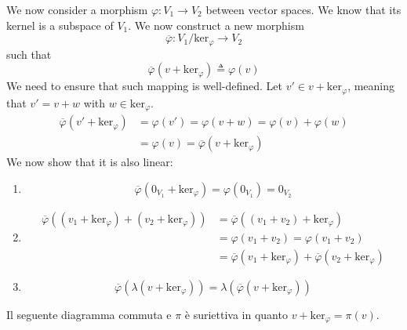 \documentclass[a4paper]{article}
\begin{document}
We now consider a morphism \(\varphi \colon V_1 \to V_2\)
between vector spaces. We know that its kernel is a subspace of \(V_1\).
We now construct a new morphism
\[
    \overline{\varphi} \colon V_1 / \text{ker}_\varphi \to V_2
\]
such that
\[
    \overline{\varphi}(v + \text{ker}_\varphi) \triangleq \varphi(v)
\]
We need to ensure that such mapping is well-defined.
Let \(v' \in v + \text{ker}_\varphi\), meaning that \(v' = v + w\) with \(w \in \text{ker}_\varphi\).
\begin{align*}
    \overline{\varphi}(v' + \text{ker}_\varphi)
    &= \varphi(v') = \varphi(v + w) = \varphi(v) + \varphi(w) \\
    &= \varphi(v) = \overline{\varphi}(v + \text{ker}_\varphi)
\end{align*}
We now show that it is also linear:
\begin{enumerate}
    \item \[
        \overline{\varphi}(0_{V_1} + \text{ker}_\varphi) = \varphi(0_{V_1}) = 0_{V_2}
    \]
    \item \begin{align*}
        \overline{\varphi}((v_1 + \text{ker}_\varphi) + (v_2 + \text{ker}_\varphi))
        &= \overline{\varphi}((v_1 + v_2) + \text{ker}_\varphi) \\
        &= \varphi(v_1 + v_2) = \varphi(v_1 + v_2) \\
        &= \overline{\varphi}(v_1 + \text{ker}_\varphi)
        + \overline{\varphi}(v_2 + \text{ker}_\varphi)
    \end{align*}
    \item \[
        \overline{\varphi}(\lambda (v + \text{ker}_\varphi)) =
        \lambda \left(\overline{\varphi}(v + \text{ker}_\varphi)\right)
    \]
\end{enumerate}

Il seguente diagramma commuta e \(\pi\) è suriettiva in quanto \(v+\text{ker}_\varphi = \pi(v)\).
\end{document}
